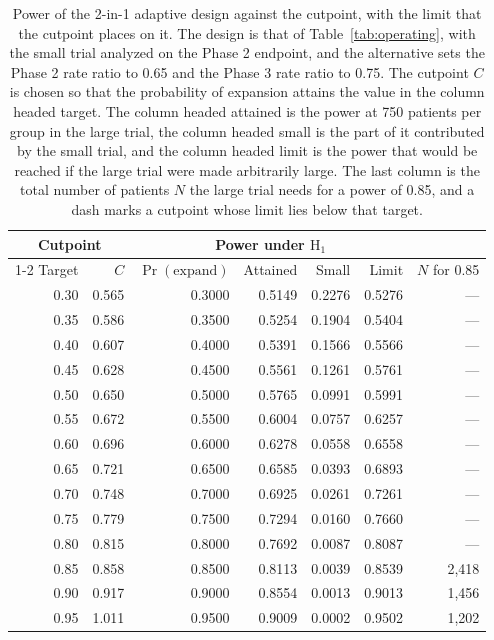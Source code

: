\begin{table}[htbp]
\centering
\caption{Power of the 2-in-1 adaptive design against the cutpoint, with the limit that the cutpoint places on it. The design is that of Table~\ref{tab:operating}, with the small trial analyzed on the Phase 2 endpoint, and the alternative sets the Phase 2 rate ratio to 0.65 and the Phase 3 rate ratio to 0.75. The cutpoint $C$ is chosen so that the probability of expansion attains the value in the column headed target. The column headed attained is the power at 750 patients per group in the large trial, the column headed small is the part of it contributed by the small trial, and the column headed limit is the power that would be reached if the large trial were made arbitrarily large. The last column is the total number of patients $N$ the large trial needs for a power of 0.85, and a dash marks a cutpoint whose limit lies below that target.}
\label{tab:limit}
\vspace{0.6em}
\small
\setlength{\tabcolsep}{4pt}
\begin{tabular}{rrrrrrr}
\hline
\multicolumn{2}{c}{Cutpoint} & \multicolumn{4}{c}{Power under $\mathrm{H}_1$} &  \\
\cline{1-2}\cline{3-6}
Target & $C$ & $\Pr(\mathrm{expand})$ & Attained & Small & Limit & $N$ for 0.85 \\
\hline
0.30 & 0.565 & 0.3000 & 0.5149 & 0.2276 & 0.5276 & --- \\
0.35 & 0.586 & 0.3500 & 0.5254 & 0.1904 & 0.5404 & --- \\
0.40 & 0.607 & 0.4000 & 0.5391 & 0.1566 & 0.5566 & --- \\
0.45 & 0.628 & 0.4500 & 0.5561 & 0.1261 & 0.5761 & --- \\
0.50 & 0.650 & 0.5000 & 0.5765 & 0.0991 & 0.5991 & --- \\
0.55 & 0.672 & 0.5500 & 0.6004 & 0.0757 & 0.6257 & --- \\
0.60 & 0.696 & 0.6000 & 0.6278 & 0.0558 & 0.6558 & --- \\
0.65 & 0.721 & 0.6500 & 0.6585 & 0.0393 & 0.6893 & --- \\
0.70 & 0.748 & 0.7000 & 0.6925 & 0.0261 & 0.7261 & --- \\
0.75 & 0.779 & 0.7500 & 0.7294 & 0.0160 & 0.7660 & --- \\
0.80 & 0.815 & 0.8000 & 0.7692 & 0.0087 & 0.8087 & --- \\
0.85 & 0.858 & 0.8500 & 0.8113 & 0.0039 & 0.8539 & 2,418 \\
0.90 & 0.917 & 0.9000 & 0.8554 & 0.0013 & 0.9013 & 1,456 \\
0.95 & 1.011 & 0.9500 & 0.9009 & 0.0002 & 0.9502 & 1,202 \\
\hline
\end{tabular}
\end{table}
